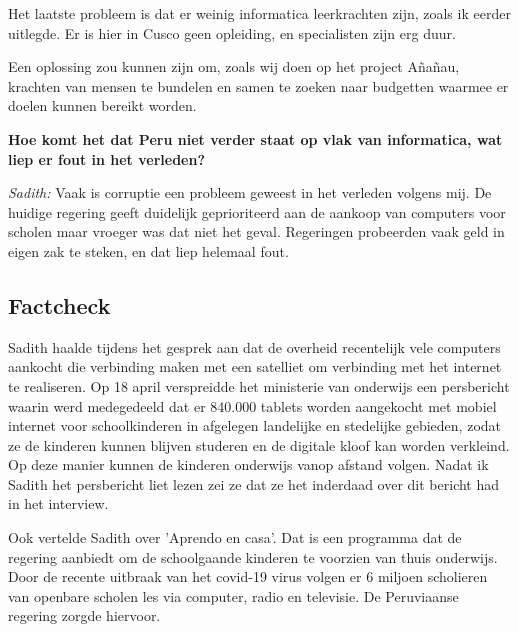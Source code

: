Het laatste probleem is dat er weinig informatica leerkrachten zijn, zoals ik eerder uitlegde. Er is hier in Cusco geen opleiding, en specialisten zijn erg duur.

Een oplossing zou kunnen zijn om, zoals wij doen op het project Añañau, krachten van mensen te bundelen en samen te zoeken naar budgetten waarmee er doelen kunnen bereikt worden. 

\textbf{Hoe komt het dat Peru niet verder staat op vlak van informatica, wat liep er fout in het verleden?}

\textit{Sadith:} Vaak is corruptie een probleem geweest in het verleden volgens mij. De huidige regering geeft duidelijk geprioriteerd aan de aankoop van computers voor scholen maar vroeger was dat niet het geval. Regeringen probeerden vaak geld in eigen zak te steken, en dat liep helemaal fout. 
 
\subsection{Factcheck}
Sadith haalde tijdens het gesprek aan dat de overheid recentelijk vele computers aankocht die verbinding maken met een satelliet om verbinding met het internet te realiseren. Op 18 april verspreidde het ministerie van onderwijs een persbericht waarin werd medegedeeld dat er 840.000 tablets worden aangekocht met mobiel internet voor schoolkinderen in afgelegen landelijke en stedelijke gebieden, zodat ze de kinderen kunnen blijven studeren en de digitale kloof kan worden verkleind. Op deze manier kunnen de kinderen onderwijs vanop afstand volgen.\autocite{Minedu2020} Nadat ik Sadith het persbericht liet lezen zei ze dat ze het inderdaad over dit bericht had in het interview. 

Ook vertelde Sadith over 'Aprendo en casa'. Dat is een programma dat de regering aanbiedt om de schoolgaande kinderen te voorzien van thuis onderwijs. Door de recente uitbraak van het covid-19 virus volgen er 6 miljoen scholieren van openbare scholen les via computer, radio en televisie. De Peruviaanse regering zorgde hiervoor. \autocite{Minedu2020a}

